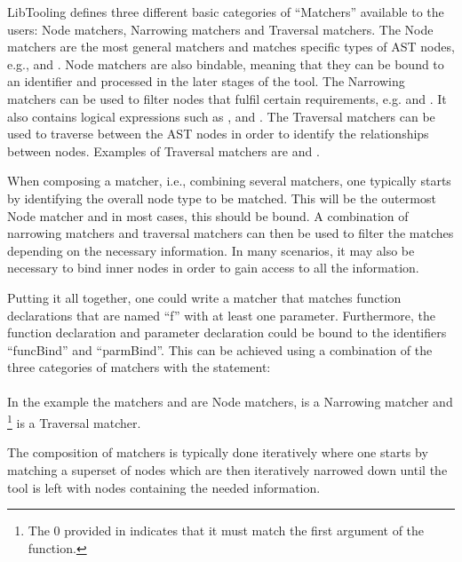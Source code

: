 LibTooling defines three different basic categories of ``Matchers'' available to the users: Node matchers, Narrowing matchers and Traversal matchers.
The Node matchers are the most general matchers and matches specific types of AST nodes, e.g.,  and . Node matchers are also bindable, meaning that they can be bound to an identifier and processed in the later stages of the tool.
The Narrowing matchers can be used to filter nodes that fulfil certain requirements, e.g.  and . It also contains logical expressions such as , and .
The Traversal matchers can be used to traverse between the AST nodes in order to identify the relationships between nodes.
Examples of Traversal matchers are  and  \cite{clangASTMatcherReference}.

When composing a matcher, i.e., combining several matchers, one typically starts by identifying the overall node type to be matched. This will be the outermost Node matcher and in most cases, this should be bound.
A combination of narrowing matchers and traversal matchers can then be used to filter the matches depending on the necessary information.
In many scenarios, it may also be necessary to bind inner nodes in order to gain access to all the information.

Putting it all together, one could write a matcher that matches function declarations that are named ``f'' with at least one parameter. Furthermore, the function declaration and parameter declaration could be bound to the identifiers ``funcBind'' and ``parmBind''.
This can be achieved using a combination of the three categories of matchers with the statement:\\ \\
In the example the matchers  and  are Node matchers,  is a Narrowing matcher and \footnote{The 0 provided in  indicates that it must match the first argument of the function.} is a Traversal matcher.

The composition of matchers is typically done iteratively where one starts by matching a superset of nodes which are then iteratively narrowed down until the tool is left with nodes containing the needed information. 

